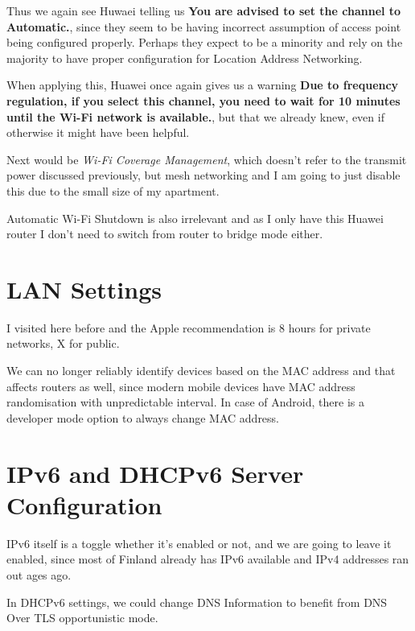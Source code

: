 \documentclass[../wifi-security.tex]{subfiles}
\begin{document}
Thus we again see Huwaei telling us \textbf{You are advised to set the channel to Automatic.}, since they seem to be having incorrect assumption of access point being configured properly. Perhaps they expect to be a minority and rely on the majority to have proper configuration for Location Address Networking.

When applying this, Huawei once again gives us a warning \textbf{Due to frequency regulation, if you select this channel, you need to wait for 10 minutes until the Wi-Fi network is available.}, but that we already knew, even if otherwise it might have been helpful.


Next would be \textit{Wi-Fi Coverage Management}, which doesn't refer to the transmit power discussed previously, but mesh networking and I am going to just disable this due to the small size of my apartment.

Automatic Wi-Fi Shutdown is also irrelevant and as I only have this Huawei router I don't need to switch from router to bridge mode either.

\section{LAN Settings}

I visited here before and the Apple recommendation is 8 hours for private networks, X for public.

We can no longer reliably identify devices based on the MAC address and that affects routers as well, since modern mobile devices have MAC address randomisation with unpredictable interval. In case of Android, there is a developer mode option to always change MAC address.

\section{IPv6 and DHCPv6 Server Configuration}

IPv6 itself is a toggle whether it's enabled or not, and we are going to leave it enabled, since most of Finland already has IPv6 available and IPv4 addresses ran out ages ago.

In DHCPv6 settings, we could change DNS Information to benefit from DNS Over TLS opportunistic mode. %

\end{document}
